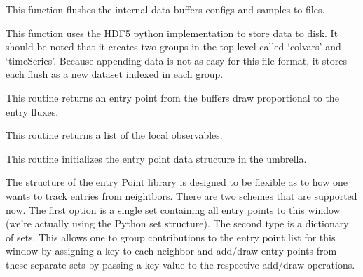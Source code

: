 \documentclass[letterpaper,10pt,english]{sphinxmanual}
\begin{document}
\begin{fulllineitems}
\begin{fulllineitems}
\end{fulllineitems}


\begin{fulllineitems}
\label{applications/applications.doc:basisFunctions.basisFunction.flush_data_to_file}
This function flushes the internal data buffers configs and samples to
files.

This function uses the HDF5 python implementation to store data to disk.
It should be noted that it creates two groups in the top-level called 
`colvars' and `timeSeries'. Because appending data is not as easy for 
this file format, it stores each flush as a new dataset indexed in each
group.

\end{fulllineitems}


\begin{fulllineitems}
\label{applications/applications.doc:basisFunctions.basisFunction.get_entry_point}
This routine returns an entry point from the buffers draw proportional to the entry fluxes.

\end{fulllineitems}


\begin{fulllineitems}
\label{applications/applications.doc:basisFunctions.basisFunction.get_local_observales}
This routine returns a list of the local observables.

\end{fulllineitems}


\begin{fulllineitems}
\label{applications/applications.doc:basisFunctions.basisFunction.initialize_entry_points}
This routine initializes the entry point data structure in the umbrella.

The structure of the entry Point library is designed to be flexible as to how one wants to track entries from
neightbors. There are two schemes that are supported now. The first option is a single set containing all
entry points to this window (we're actually using the Python set structure). The second type is a dictionary
of sets. This allows one to group contributions to the entry point list for this window by assigning a key to
each neighbor and add/draw entry points from these separate sets by passing a key value to the respective add/draw
operations.


\end{fulllineitems}
\end{fulllineitems}
\end{document}
